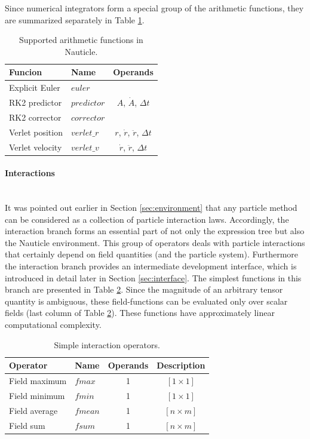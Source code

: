 \documentclass[a4paper,12pt,openany]{book}
\newcommand{\myparagraph}[1]{\paragraph{#1}\mbox{}\\}
\theoremstyle{break}
\begin{document}
Since numerical integrators form a special group of the arithmetic functions, they are summarized separately in Table \ref{tbl:arfc_int}. 
\begin{table} [H]
\begin{center}
\caption{Supported arithmetic functions in Nauticle.}\label{tbl:arfc_int}
\begin{tabular}{ l l c }
\toprule[1.5pt]
\bf Funcion & \bf Name & \bf Operands \\ 
\midrule
Explicit Euler & $euler$ & \multirow{3}{*}{$A$, $\dot A$, $\Delta t$}   \\
RK2 predictor & $predictor$ & \\
RK2 corrector & $corrector$ &  \\
Verlet position & $verlet\_r$ & $r$, $\dot r$, $\ddot r$, $\Delta t$ \\
Verlet velocity & $verlet\_v$ & $\dot r$, $\ddot r$, $\Delta t$ \\
\bottomrule[1.25pt]
\end{tabular}
\end{center}
\end{table}

\myparagraph{Interactions}
It was pointed out earlier in Section \ref{sec:environment} that any particle method can be considered as a collection of particle interaction laws. Accordingly, the interaction branch forms an essential part of not only the expression tree but also the Nauticle environment. This group of operators deals with particle interactions that certainly depend on field quantities (and the particle system). Furthermore the interaction branch provides an intermediate development interface, which is introduced in detail later in Section \ref{sec:interface}.
The simplest functions in this branch are presented in Table \ref{tbl:fsearch}. Since the magnitude of an arbitrary tensor quantity is ambiguous, these field-functions can be evaluated only over scalar fields (last column of Table \ref{tbl:fsearch}). These functions have approximately linear computational complexity.
\begin{table}[H]
\begin{center}
\caption{Simple interaction operators.}\label{tbl:fsearch}
\begin{tabular}{ l l c c }
\toprule[1.5pt]
\bf Operator & \bf Name & \bf Operands & \bf Description\\
\midrule
Field maximum & $fmax$ & 1 & $[1 \times 1]$\\ 
Field minimum & $fmin$ & 1 & $[1 \times 1]$\\ 
Field average & $fmean$ & 1 & $[n \times m]$\\
Field sum & $fsum$ & 1 & $[n \times m]$\\
\bottomrule[1.25pt]
\end{tabular}
\end{center}
\end{table}
\end{document}
